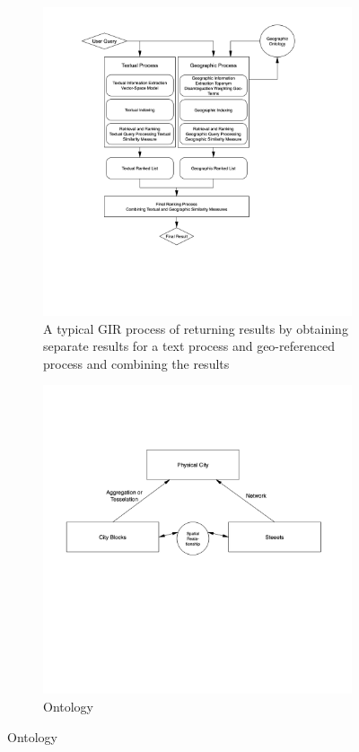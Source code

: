 \documentclass[10pt, conference, compsocconf]{IEEEtran}
\begin{document}
\begin{figure}[h]
\centering

\begin{subfigure}[b]{0.4\textwidth}
\centering
\includegraphics[scale=.2]{images/gir.png}
\caption{A typical GIR process of returning results by obtaining separate results for a text process and geo-referenced process and combining the results}
\label{fig:gir}
\end{subfigure}

\begin{subfigure}[b]{0.4\textwidth}
\centering
\includegraphics[scale=.2]{images/onto2.png}
\caption{Ontology}
\label{fig:onto2}
\end{subfigure}

\end{figure}
\end{document}
